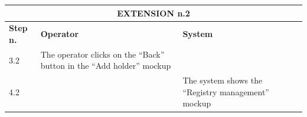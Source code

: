 {{{\begin{center}
			\begin{tabular}{|p{2cm}|p{6cm}|p{6cm}|}
			\hline
				\multicolumn{3}{|c|}{EXTENSION n.2}\\
			\hline
				\centering \vspace{1mm} \bfseries{Step n.} \vspace{1mm} & \vspace{1mm} \bfseries{Operator} \vspace{1mm} & \vspace{1mm} \bfseries{System} \vspace{1mm}\\
			\hline
				\vspace{1mm} 3.2 \vspace{1mm} &
				\vspace{1mm} The operator clicks on the “Back” button in the “Add holder”  mockup \vspace{1mm} & 
				\vspace{1mm} \vspace{1mm} \\
			\hline
				\vspace{1mm} 4.2 \vspace{1mm} &
				\vspace{1mm} \vspace{1mm} & 
				\vspace{1mm} The system shows the “Registry management” mockup \vspace{1mm} \\
			\hline
			\end{tabular}
			\end{center}
			
			\cleardoublepage
		}			
	}
}